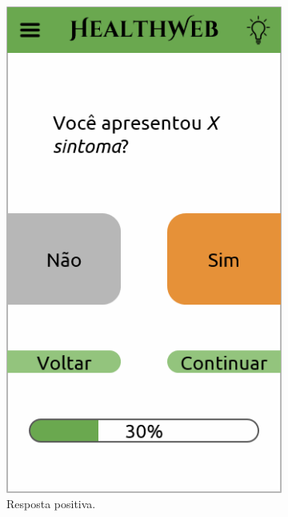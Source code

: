 \begin{figure}[htbp]
\begin{subfigure}{0.24\linewidth}
		\includegraphics[width=\linewidth]{figure/prototype/mobile/symptom_yes.png}
		\caption{Resposta positiva.}
		\label{fig:mobile:symptom_yes}
	\end{subfigure}
	\hfill
	\begin{subfigure}{0.24\linewidth}
		\centering

\end{subfigure}
\end{figure}
